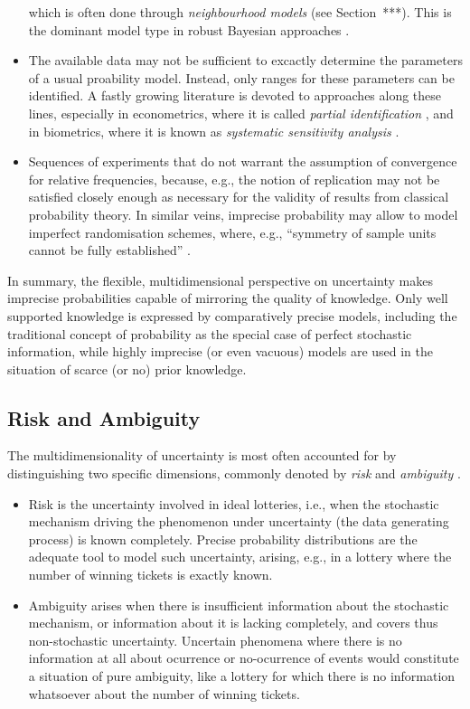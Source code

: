 \begin{itemize}
which is often done through \emph{neighbourhood models} (see Section~***).
This is the dominant model type in robust Bayesian approaches \parencite[see, e.g.,][]{1994:berger}.
\item The available data may not be sufficient to excactly determine the parameters of a usual proability model.
Instead, only ranges for these parameters can be identified.
A fastly growing literature is devoted to approaches along these lines,
especially in econometrics, where it is called \emph{partial identification} \parencite[e.g.,][]{2003:manski},
and in biometrics, where it is known as \emph{systematic sensitivity analysis} \parencite[e.g.,][]{vansteelandt2006}.
\item Sequences of experiments that do not warrant the assumption of convergence
for relative frequencies, because, e.g., the notion of replication may not be
satisfied closely enough as necessary for the validity of results from classical probability theory.
In similar veins, imprecise probability may allow to model
imperfect randomisation schemes, where, e.g., ``symmetry of sample units cannot be fully established''
\parencite[\S 2.5]{itip-statinf}.
\end{itemize}
In summary,
the flexible, multidimensional perspective on uncertainty makes imprecise probabilities capable of mirroring the quality of knowledge.
Only well supported knowledge is expressed by comparatively precise models,
including the traditional concept of probability as the special case of perfect stochastic information,
while highly imprecise (or even vacuous) models are used in the situation of scarce (or no) prior knowledge.

\subsection{Risk and Ambiguity}
\label{sec:motivation-riskambiguity}

The multidimensionality of uncertainty is most often accounted for
by distinguishing two specific dimensions,
commonly denoted by \emph{risk} and \emph{ambiguity} \parencite[e.g., by][]{1961:ellsberg}.

\begin{itemize}
\item Risk is the uncertainty involved in ideal lotteries,
i.e., when the stochastic mechanism driving the phenomenon under uncertainty
(the data generating process) is known completely.
Precise probability distributions are the adequate tool to model such uncertainty,
arising, e.g., in a lottery where the number of winning tickets is exactly known.
\item Ambiguity arises when there is insufficient information about the stochastic mechanism,
or information about it is lacking completely, and covers thus non-stochastic uncertainty.
Uncertain phenomena where there is no information at all
about ocurrence or no-ocurrence of events would constitute a situation of pure ambiguity,
like a lottery for which there is no information whatsoever about the number of winning tickets.
\end{itemize}

